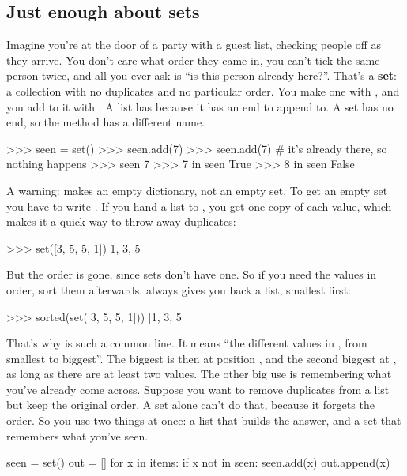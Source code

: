\documentclass[10pt,a4paper]{article}
\begin{document}
\subsection{Just enough about sets}
Imagine you’re at the door of a party with a guest list, checking people off as they arrive. You don’t care what order they came in, you can’t tick the same person twice, and all you ever ask is “is this person already here?”. That’s a \textbf{set}: a collection with no duplicates and no particular order.
You make one with , and you add to it with . A list has  because it has an end to append to. A set has no end, so the method has a different name.
\begin{txtcode}
>>> seen = set()
>>> seen.add(7)
>>> seen.add(7)       # it's already there, so nothing happens
>>> seen
{7}
>>> 7 in seen
True
>>> 8 in seen
False
\end{txtcode}
A warning: \code{\{\}} makes an empty dictionary, not an empty set. To get an empty set you have to write .
If you hand a list to , you get one copy of each value, which makes it a quick way to throw away duplicates:
\begin{txtcode}
>>> set([3, 5, 5, 1])
{1, 3, 5}
\end{txtcode}
But the order is gone, since sets don’t have one. So if you need the values in order, sort them afterwards.  always gives you back a list, smallest first:
\begin{txtcode}
>>> sorted(set([3, 5, 5, 1]))
[1, 3, 5]
\end{txtcode}
That’s why  is such a common line. It means “the different values in , from smallest to biggest”. The biggest is then at position , and the second biggest at , as long as there are at least two values.
The other big use is remembering what you’ve already come across. Suppose you want to remove duplicates from a list but keep the original order. A set alone can’t do that, because it forgets the order. So you use two things at once: a list that builds the answer, and a set that remembers what you’ve seen.
\begin{pycode}
seen = set()
out = []
for x in items:
    if x not in seen:
        seen.add(x)
        out.append(x)
\end{pycode}
\end{document}
